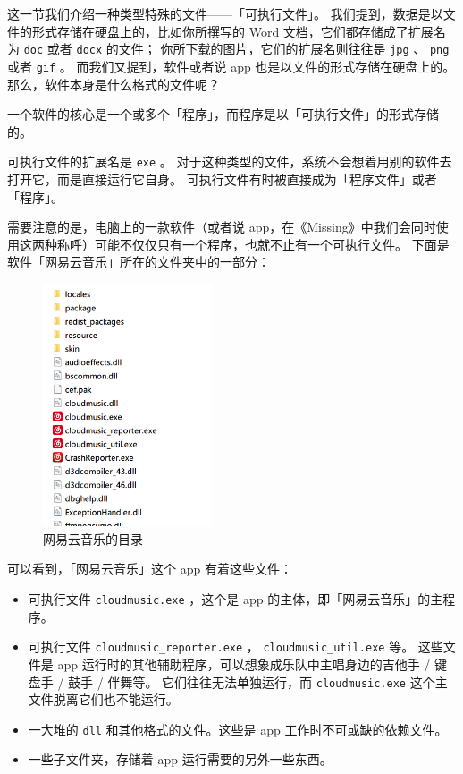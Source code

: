 这一节我们介绍一种类型特殊的文件——「可执行文件」。
我们提到，数据是以文件的形式存储在硬盘上的，比如你所撰写的 Word 文档，它们都存储成了扩展名为 \verb|doc| 或者 \verb|docx| 的文件；
你所下载的图片，它们的扩展名则往往是 \verb|jpg| 、 \verb|png| 或者 \verb|gif| 。
而我们又提到，软件或者说 app 也是以文件的形式存储在硬盘上的。
那么，软件本身是什么格式的文件呢？

一个软件的核心是一个或多个「程序」，而程序是以「可执行文件」的形式存储的。

可执行文件的扩展名是 \verb|exe| 。
对于这种类型的文件，系统不会想着用别的软件去打开它，而是直接运行它自身。
可执行文件有时被直接成为「程序文件」或者「程序」。

需要注意的是，电脑上的一款软件（或者说 app，在《Missing》中我们会同时使用这两种称呼）可能不仅仅只有一个程序，也就不止有一个可执行文件。
下面是软件「网易云音乐」所在的文件夹中的一部分：

\begin{figure}[htb!]
  \centering
  \includegraphics[width=5cm]{assets/NetEase_Music.png}
  \caption{网易云音乐的目录}
  \label{NetEase_Music}
\end{figure}

可以看到，「网易云音乐」这个 app 有着这些文件：

\begin{itemize}
  \item 可执行文件 \verb|cloudmusic.exe| ，这个是 app 的主体，即「网易云音乐」的主程序。
  \item 可执行文件 \verb|cloudmusic_reporter.exe| ， \verb|cloudmusic_util.exe| 等。
    这些文件是 app 运行时的其他辅助程序，可以想象成乐队中主唱身边的吉他手 / 键盘手 / 鼓手 / 伴舞等。
    它们往往无法单独运行，而 \verb|cloudmusic.exe| 这个主文件脱离它们也不能运行。
  \item 一大堆的 \verb|dll| 和其他格式的文件。这些是 app 工作时不可或缺的依赖文件。
  \item 一些子文件夹，存储着 app 运行需要的另外一些东西。
\end{itemize}

